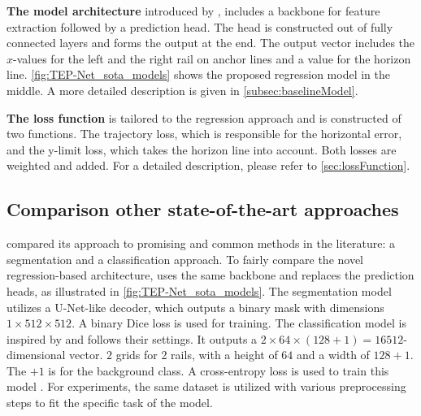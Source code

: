 \vspace{1cm} %

\noindent \textbf{The model architecture} introduced by \cite{tepNet2024}, includes a backbone for feature extraction followed by a prediction head.
The head is constructed out of fully connected layers and forms the output at the end.
The output vector includes the $x$-values for the left and the right rail on anchor lines and a value for the horizon line.
\autoref{fig:TEP-Net_sota_models} shows the proposed regression model in the middle.
A more detailed description is given in \autoref{subsec:baselineModel}.

\vspace{1cm} %

\noindent \textbf{The loss function} is tailored to the regression approach and is constructed of two functions.
The trajectory loss, which is responsible for the horizontal error, and the y-limit loss, which takes the horizon line into account.
Both losses are weighted and added.
For a detailed description, please refer to \autoref{sec:lossFunction}.

\subsection{Comparison other state-of-the-art approaches}

\cite{tepNet2024} compared its approach to promising and common methods in the literature: a segmentation and a classification approach.
To fairly compare the novel regression-based architecture, \cite{tepNet2024} uses the same backbone and replaces the prediction heads, as illustrated in \autoref{fig:TEP-Net_sota_models}.
The segmentation model utilizes a U-Net-like \cite{uNet2015} decoder, which outputs a binary mask with dimensions $1 \times 512 \times 512$.
A binary Dice loss is used for training.
The classification model is inspired by \cite{li2022rail} and follows their settings.
It outputs a $2 \times 64 \times (128 + 1) = 16512$-dimensional vector.
$2$ grids for 2 rails, with a height of $64$ and a width of $128+1$.
The $+1$ is for the background class.
A cross-entropy loss is used to train this model \cite{tepNet2024}.
For experiments, the same dataset is utilized with various preprocessing steps to fit the specific task of the model.

